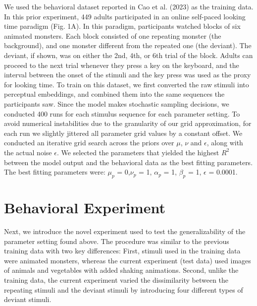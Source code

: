 \documentclass[10pt, letterpaper]{article}
\begin{document}
We used the behavioral dataset reported in Cao et al. (2023) as the
training data. In this prior experiment, 449 adults participated in an
online self-paced looking time paradigm (Fig. 1A). In this paradigm,
participants watched blocks of six animated monsters. Each block
consisted of one repeating monster (the background), and one monster
different from the repeated one (the deviant). The deviant, if shown,
was on either the 2nd, 4th, or 6th trial of the block. Adults can
proceed to the next trial whenever they press a key on the keyboard, and
the interval between the onset of the stimuli and the key press was used
as the proxy for looking time. To train on this dataset, we first
converted the raw stimuli into perceptual embeddings, and combined them
into the same sequences the participants saw. Since the model makes
stochastic sampling decisions, we conducted 400 runs for each stimulus
sequence for each parameter setting. To avoid numerical instabilities
due to the granularity of our grid approximation, for each run we
slightly jittered all parameter grid values by a constant offset. We
conducted an iterative grid search across the priors over \(\mu\),
\(\nu\) and \(\epsilon\), along with the actual noise \(\epsilon\). We
selected the parameters that yielded the highest \(R^2\) between the
model output and the behavioral data as the best fitting parameters. The
best fitting parameters were: \(\mu_{p}\) = 0,\(\nu_{p}\) = 1,
\(\alpha_{p}\) = 1, \(\beta_{p}\) = 1, \(\epsilon\) = 0.0001.

\hypertarget{behavioral-experiment}{%
\section{Behavioral Experiment}\label{behavioral-experiment}}

Next, we introduce the novel experiment used to test the
generalizability of the parameter setting found above. The procedure was
similar to the previous training data with two key differences: First,
stimuli used in the training data were animated monsters, whereas the
current experiment (test data) used images of animals and vegetables
with added shaking animations. Second, unlike the training data, the
current experiment varied the dissimilarity between the repeating
stimuli and the deviant stimuli by introducing four different types of
deviant stimuli.
\end{document}
